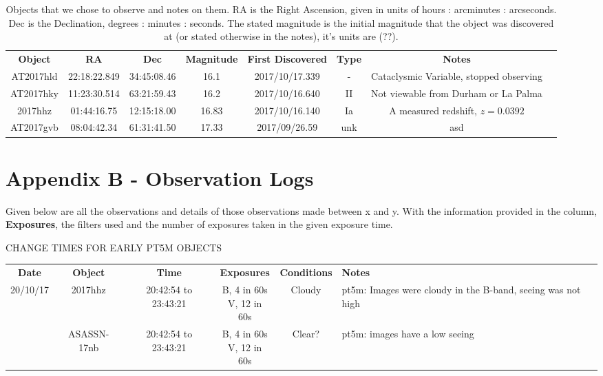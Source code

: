 \documentclass[twocolumn]{revtex4}
\begin{document}
{\renewcommand{\arraystretch}{1.2}%
\begin{table}[h!]
\centering    
\begin{tabularx}{\textwidth}{c@{\hskip 5pt} c c@{\hskip 5pt} c@{\hskip 5pt} c@{\hskip 5pt} c@{\hskip 5pt} c@{\hskip 5pt} X}
    \hline
    \textbf{Object} & \textbf{RA} & \textbf{Dec} & \textbf{Magnitude} &\textbf{First Discovered} &\textbf{Type} & \textbf{Notes} \\ 
    AT2017hld & 22:18:22.849 & 34:45:08.46 & 16.1 & 2017/10/17.339 & - & {Cataclysmic Variable, stopped observing}  \\
    AT2017hky & 11:23:30.514 & 63:21:59.43 & 16.2 & 2017/10/16.640 & II & {Not viewable from Durham or La Palma}  \\
    2017hhz & 01:44:16.75 & 12:15:18.00 & 16.83 & 2017/10/16.140 & Ia & {A measured redshift, $z=0.0392$}  \\
    AT2017gvb & 08:04:42.34 & 61:31:41.50 & 17.33 & 2017/09/26.59 & unk & {asd}  \\

    \hline      
\end{tabularx}
\caption{Objects that we chose to observe and notes on them. RA is the Right Ascension, given in units of hours : arcminutes : arcseconds. Dec is the Declination, degrees : minutes : seconds. The stated magnitude is the initial magnitude that the object was discovered at (or stated otherwise in the notes), it's units are (??).}
\label{objects}
\end{table}


\clearpage

\onecolumngrid
\vspace{-3ex}
\section*{Appendix B - Observation Logs} \label{obslogs}
\vspace{-2ex}
Given below are all the observations and details of those observations made between x and y. With the information provided in the column, \textbf{Exposures}, the filters used and the number of exposures taken in the given exposure time.

CHANGE TIMES FOR EARLY PT5M OBJECTS

{\renewcommand{\arraystretch}{1.2}%
\begin{table}[h!]
\centering    
\begin{tabularx}{\textwidth}{c@{\hskip 5pt} c c@{\hskip 5pt} c@{\hskip 5pt} c@{\hskip 5pt} X}
    \hline
    \textbf{Date} & \textbf{Object} & \textbf{Time} & \textbf{Exposures} & \textbf{  Conditions  } & \textbf{Notes} \\ 
    20/10/17 & 2017hhz & 20:42:54 to 23:43:21 & \makecell{B, 4 in 60s \\ V, 12 in 60s} & {Cloudy} & {pt5m: Images were cloudy in the B-band, seeing was not high}  \\
    	& ASASSN-17nb &  20:42:54 to 23:43:21 & \makecell{B, 4 in 60s \\ V, 12 in 60s} & {Clear?} & {pt5m: images have a low seeing} \\      
	

\end{tabularx}
\end{table}}}
\end{document}
